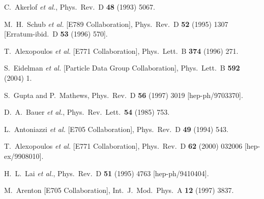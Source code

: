 \begin{thebibliography}{999}
C.~Akerlof {\it et al.},
Phys.\ Rev.\ D {\bf 48} (1993) 5067.

M.~H.~Schub {\it et al.}  [E789 Collaboration],
Phys.\ Rev.\ D {\bf 52} (1995) 1307
[Erratum-ibid.\ D {\bf 53} (1996) 570].

T.~Alexopoulos {\it et al.}  [E771 Collaboration],
Phys.\ Lett.\ B {\bf 374} (1996) 271.

S.~Eidelman {\it et al.}  [Particle Data Group Collaboration],
Phys.\ Lett.\ B {\bf 592} (2004) 1.

S.~Gupta and P.~Mathews,
Phys.\ Rev.\ D {\bf 56} (1997) 3019
[hep-ph/9703370].

D.~A.~Bauer {\it et al.},
Phys.\ Rev.\ Lett.\  {\bf 54} (1985) 753.

L.~Antoniazzi {\it et al.}  [E705 Collaboration],
Phys.\ Rev.\ D {\bf 49} (1994) 543.

T.~Alexopoulos {\it et al.}  [E771 Collaboration],
Phys.\ Rev.\ D {\bf 62} (2000) 032006
[hep-ex/9908010].

H.~L.~Lai {\it et al.},
Phys.\ Rev.\ D {\bf 51} (1995) 4763
[hep-ph/9410404].

M.~Arenton  [E705 Collaboration],
Int.\ J.\ Mod.\ Phys.\ A {\bf 12} (1997) 3837.


\end{thebibliography}
